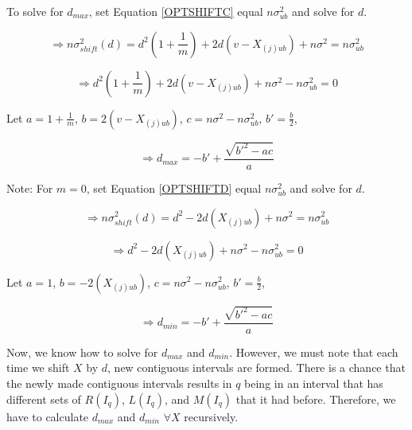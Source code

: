 \documentclass[a4paper,12pt]{article}
\begin{document}
To solve for $d_{max}$, set Equation \ref{OPTSHIFTC} equal $n \sigma_{ub}^2$ and solve for $d$. 

$$
\Rightarrow n\sigma^2_{shift}(d)= d^2(1+\frac{1}{m}) + 2d(v-X_{(j)ub}) + n\sigma^2 = n \sigma_{ub}^2
$$

$$
\Rightarrow d^2(1+\frac{1}{m}) + 2d(v-X_{(j)ub}) + n\sigma^2 - n \sigma_{ub}^2 = 0
$$

Let $a = 1+\frac{1}{m}$, $b=2(v-X_{(j)ub})$, $c=n\sigma^2 - n \sigma_{ub}^2$, $b'=\frac{b}{2}$, 

$$ \Rightarrow d_{max}= -b' + \frac{\sqrt{b'^2-ac}}{a}$$

Note: For $m = 0$, set Equation \ref{OPTSHIFTD} equal $n \sigma_{ub}^2$ and solve for $d$. 

$$
\Rightarrow n\sigma^2_{shift}(d)= d^2 - 2d(X_{(j)ub}) + n\sigma^2 = n \sigma_{ub}^2
$$

$$
\Rightarrow d^2 - 2d(X_{(j)ub}) + n\sigma^2 - n \sigma_{ub}^2 = 0
$$

Let $a = 1$, $b=-2(X_{(j)ub})$, $c=n\sigma^2 - n \sigma_{ub}^2$, $b'=\frac{b}{2}$, 

$$ \Rightarrow d_{min}= -b' + \frac{\sqrt{b'^2-ac}}{a}$$

Now, we know how to solve for $d_{max}$ and  $d_{min}$. However, we must note that each time we shift $X$ by $d$, new contiguous intervals are formed. There is a chance that the newly made contiguous intervals results in $q$ being in an interval that has different sets of $R(I_{q})$, $L(I_{q})$, and  $M(I_{q})$
that it had before. Therefore, we have to calculate $d_{max}$ and  $d_{min}$ $\forall X$ recursively. 
\end{document}
